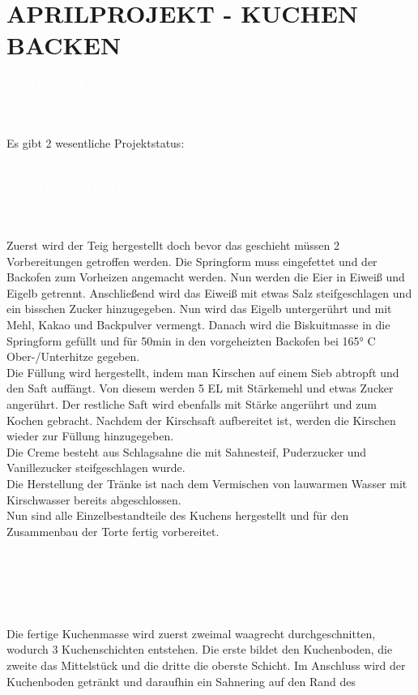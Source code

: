 \documentclass[a4paper, 12 pt]{article}
\newcommand{\coloredSectionDark}[1]{{\small \colorbox{DodgerBlue2}{\begin{minipage}{0.99\textwidth}{\textbf{#1 \vphantom{p\^{E}}}}\end{minipage}}}}
\newcommand{\coloredSection}[1]{{\small \colorbox{DeepSkyBlue1}{\begin{minipage}{0.99\textwidth}{\textbf{#1 \vphantom{p\^{E}}}}\end{minipage}}}}
\begin{document}
\section*{\textcolor{DodgerBlue2}{APRILPROJEKT - KUCHEN BACKEN}}

\noindent
\coloredSectionDark{\textbf{\textcolor{white}{PROJEKTSTATUS}}}\\[-0.3cm]\\
Es gibt 2 wesentliche Projektstatus:\\\\
\noindent
\coloredSection{\textbf{\textcolor{white}{1. PROJEKTSTATUS}}}\\[-0.3cm]\\
Zuerst wird der Teig hergestellt doch bevor das geschieht müssen 2 Vorbereitungen getroffen werden. 
Die Springform muss eingefettet und der Backofen zum Vorheizen angemacht werden. Nun werden die Eier in Eiweiß und Eigelb getrennt.
Anschließend wird das Eiweiß mit etwas Salz steifgeschlagen und ein bisschen Zucker hinzugegeben. Nun wird das Eigelb untergerührt und mit Mehl, Kakao und Backpulver
vermengt. Danach wird die Biskuitmasse in die Springform gefüllt und für 50min in den vorgeheizten Backofen bei 165° C Ober-/Unterhitze
gegeben.\\
Die Füllung wird hergestellt, indem man Kirschen auf einem Sieb abtropft und den Saft auffängt. Von diesem werden 5 EL mit Stärkemehl und etwas Zucker
angerührt. Der restliche Saft wird ebenfalls mit Stärke angerührt und zum Kochen gebracht. Nachdem der Kirschsaft aufbereitet ist, werden die Kirschen wieder zur Füllung hinzugegeben. \\
Die Creme besteht aus Schlagsahne die mit Sahnesteif, Puderzucker und Vanillezucker steifgeschlagen wurde.\\
Die Herstellung der Tränke ist nach dem Vermischen von lauwarmen Wasser mit Kirschwasser bereits abgeschlossen. \\
Nun sind alle Einzelbestandteile des Kuchens hergestellt und für den Zusammenbau der Torte fertig vorbereitet.\\\\
\noindent
\coloredSection{\textbf{\textcolor{white}{2. PROJEKTSTATUS}}}\\[-0.3cm]\\
Die fertige Kuchenmasse wird zuerst zweimal waagrecht durchgeschnitten, wodurch 3 Kuchenschichten entstehen. Die erste bildet den Kuchenboden,
die zweite das Mittelstück und die dritte die oberste Schicht. Im Anschluss wird der Kuchenboden getränkt und daraufhin ein Sahnering auf den Rand des 
\end{document}
